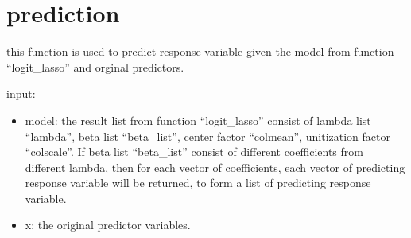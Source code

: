 \documentclass[
]{article}
\begin{document}
\hypertarget{prediction}{%
\section{prediction}\label{prediction}}

this function is used to predict response variable given the model from
function ``logit\_lasso'' and orginal predictors.

input:

\begin{itemize}
\item
  model: the result list from function ``logit\_lasso'' consist of
  lambda list ``lambda'', beta list ``beta\_list'', center factor
  ``colmean'', unitization factor ``colscale''. If beta list
  ``beta\_list'' consist of different coefficients from different
  lambda, then for each vector of coefficients, each vector of
  predicting response variable will be returned, to form a list of
  predicting response variable.
\item
  x: the original predictor variables.
\end{itemize}
\end{document}
